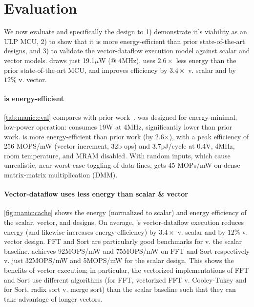 \section{Evaluation}
\label{manic:eval}
We now evaluate \msilicon and specifically the \manic design to 1) demonstrate it's viability as an ULP MCU, 2) to show that it is more energy-efficient than prior state-of-the-art designs, and 3) to validate the vector-dataflow execution model against scalar and vector models.
% 
\manic draws just 19.1$\mu$W (@ 4MHz), uses $2.6\times$ less energy than the prior state-of-the-art MCU, and improves efficiency by $3.4\times$ v. scalar and by $12\%$ v. vector.

\tabMANICEval
\paragraph{\manic is energy-efficient}
\autoref{tab:manic:eval} compares \manic with prior work~\cite{keller2017risc,karnik2018cm,bol201919,prabhat202027}.
%
\manic was designed for energy-minimal, low-power operation: \manic consumes 19\textmu W at 4MHz, significantly lower than prior work.
%
\manic is more energy-efficient than prior work (by 2.6$\times$), with a peak efficiency of 256 MOPS/mW (vector increment, 32b ops) and 3.7pJ/cycle at 0.4V, 4MHz, room temperature, and MRAM disabled.
%
With random inputs, which cause unrealistic, near worst-case toggling of data lines, \manic gets 45 MOPs/mW on dense matrix-matrix multiplication (DMM).

\figMANICEnergyCache
\paragraph{Vector-dataflow uses less energy than scalar \& vector}
\autoref{fig:manic:cache} shows the energy (normalized to scalar) and energy efficiency of the scalar, vector, and \manic designs.
% 
On average, \manic's vector-dataflow execution reduces energy (and likewise increases energy-efficiency) by $3.4\times$ v. scalar and by $12\%$ v. vector design.
% 
FFT and Sort are particularly good benchmarks for \manic v. the scalar baseline.
% 
\manic achieves 92MOPS/mW and 75MOPS/mW on FFT and Sort respectively v. just 32MOPS/mW and 5MOPS/mW for the scalar design.
% 
This shows the benefits of vector execution; in particular, the vectorized implementations of FFT and Sort use different algorithms (for FFT, vectorized FFT v. Cooley-Tukey and for Sort, radix sort v. merge sort) than the scalar baseline such that they can take advantage of longer vectors.

